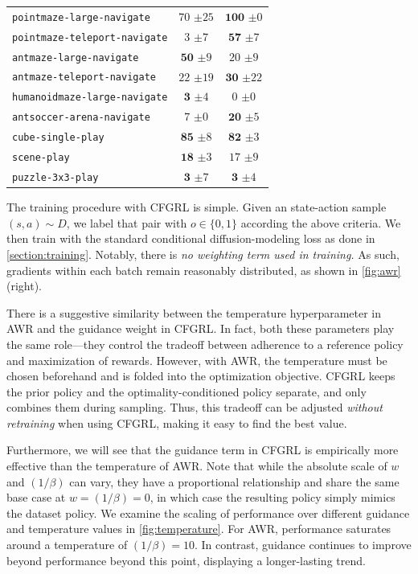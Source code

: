 \documentclass{article}
\begin{document}
\begin{table}[t!]
\begin{minipage}{.53\linewidth}
{\begin{tabular}{lcc}
\texttt{pointmaze-large-navigate} & $70$ {\tiny $\pm 25$} & $\mathbf{100}$ {\tiny $\pm 0$} \\
\texttt{pointmaze-teleport-navigate} & $3$ {\tiny $\pm 7$} & $\mathbf{57}$ {\tiny $\pm 7$} \\
\texttt{antmaze-large-navigate} & $\mathbf{50}$ {\tiny $\pm 9$} & $20$ {\tiny $\pm 9$} \\
\texttt{antmaze-teleport-navigate} & $22$ {\tiny $\pm 19$} & $\mathbf{30}$ {\tiny $\pm 22$} \\
\texttt{humanoidmaze-large-navigate} & $\mathbf{3}$ {\tiny $\pm 4$} & $0$ {\tiny $\pm 0$} \\
\texttt{antsoccer-arena-navigate} & $7$ {\tiny $\pm 0$} & $\mathbf{20}$ {\tiny $\pm 5$} \\
\texttt{cube-single-play} & $\mathbf{85}$ {\tiny $\pm 8$} & $\mathbf{82}$ {\tiny $\pm 3$} \\
\texttt{scene-play} & $\mathbf{18}$ {\tiny $\pm 3$} & $17$ {\tiny $\pm 9$} \\
\texttt{puzzle-3x3-play} & $\mathbf{3}$ {\tiny $\pm 7$} & $\mathbf{3}$ {\tiny $\pm 4$} \\

\bottomrule
\end{tabular}
}
\end{minipage}
\end{table}


The training procedure with CFGRL is simple. Given an state-action sample $(s,a) \sim D$, we label that pair with $o \in \{0,1\}$ according the above criteria. We then train with the standard conditional diffusion-modeling loss as done in \cref{section:training}. Notably, there is \textit{no weighting term used in training.} As such, gradients within each batch remain reasonably distributed, as shown in \cref{fig:awr} (right).


There is a suggestive similarity between the temperature hyperparameter in AWR and the guidance weight in CFGRL. In fact, both these parameters play the same role---they control the tradeoff between adherence to a reference policy and maximization of rewards. However, with AWR, the temperature must be chosen beforehand and is folded into the optimization objective. CFGRL keeps the prior policy and the optimality-conditioned policy separate, and only combines them during sampling. Thus, this tradeoff can be adjusted \textit{without retraining} when using CFGRL, making it easy to find the best value.

Furthermore, we will see that the guidance term in CFGRL is empirically more effective than the temperature of AWR. Note that while the absolute scale of $w$ and $(1/\beta)$ can vary, they have a proportional relationship and share the same base case at $w=(1/\beta)=0$, in which case the resulting policy simply mimics the dataset policy. We examine the scaling of performance over different guidance and temperature values in \cref{fig:temperature}. For AWR, performance saturates around a temperature of $(1/\beta)=10$. In contrast, guidance continues to improve beyond performance beyond this point, displaying a longer-lasting trend.
\end{document}
